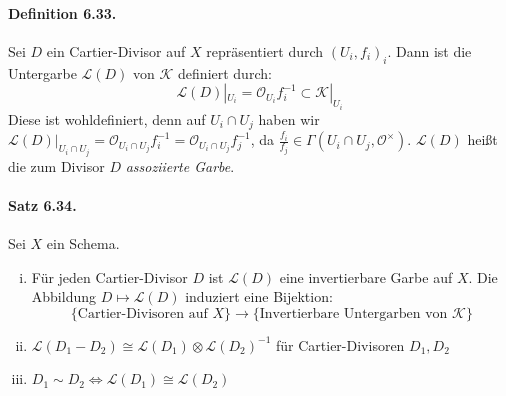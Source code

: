 \documentclass[11pt,b5paper,openany]{memoir}
\begin{document}
\paragraph{Definition 6.33.}\label{6.33} Sei $D$ ein Cartier-Divisor auf $X$ repräsentiert durch $(U_i,f_i)_i$. Dann ist die Untergarbe $\mathcal{L}(D)$ von $\mathcal{K}$ definiert durch:
\[\mathcal{L}(D)|_{U_i}=\mathcal{O}_{U_i}f_i^{-1}\subset\mathcal{K}|_{U_i} \]
Diese ist wohldefiniert, denn auf $U_i\cap U_j$ haben wir $\mathcal{L}(D)|_{U_i\cap U_j}=\mathcal{O}_{U_i\cap U_j}f_i^{-1}=\mathcal{O}_{U_i\cap U_j}f_j^{-1}$, da $\frac{f_i}{f_j}\in\Gamma(U_i\cap U_j,\mathcal{O}^\times)$. $\mathcal{L}(D)$ heißt die zum Divisor $D$ \textit{assoziierte Garbe}.

\paragraph{Satz 6.34.}\label{6.34} Sei $X$ ein Schema.
\begin{enumerate}[(i)]
\item Für jeden Cartier-Divisor $D$ ist $\mathcal{L}(D)$ eine invertierbare Garbe auf $X$. Die Abbildung $D\mapsto\mathcal{L}(D)$ induziert eine Bijektion:
\[\{\text{Cartier-Divisoren auf }X \}\to\{\text{Invertierbare Untergarben von }\mathcal{K} \} \]
\item $\mathcal{L}(D_1-D_2)\cong\mathcal{L}(D_1)\otimes\mathcal{L}(D_2)^{-1}$ für Cartier-Divisoren $D_1,D_2$
\item $D_1\sim D_2\iff\mathcal{L}(D_1)\cong\mathcal{L}(D_2)$
\end{enumerate}
\end{document}
